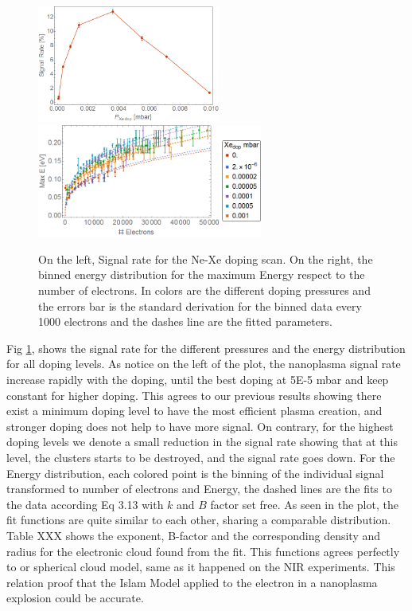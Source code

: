 \begin{figure}[h!]
\centering

\hspace*{\fill}
{ \includegraphics[width=6cm]{../Images/results/MIR_Ne_XeDop_39K/SigRate.png}} \hfill {\includegraphics[width=7.4cm]{../Images/results/MIR_Ne_XeDop_39K/binned.png}}
\hspace*{\fill}
\caption[MIR Ne-Xe doping scan. Signal rate and Energy distribution]{On the left, Signal rate for the Ne-Xe doping scan. On the right, the binned energy distribution for the maximum Energy respect to the number of electrons. In colors are the different doping pressures and the errors bar is the standard derivation for the binned data every 1000 electrons and the dashes line are the fitted parameters.}
\label{fig:NeonsigrateXedop}
\end{figure}


Fig \ref{fig:NeonsigrateXedop}, shows the signal rate for the different pressures and the energy distribution for all doping levels. As notice on the left of the plot, the nanoplasma signal rate increase rapidly with the doping, until the best doping at 5E-5 mbar and keep constant for higher doping. This agrees to our previous results showing there exist a minimum doping level to have the most efficient plasma creation, and stronger doping does not help to have more signal. On contrary, for the highest doping levels we denote a small reduction in the signal rate showing that at this level, the clusters starts to be destroyed, and the signal rate goes down.
For the Energy distribution, each colored point is the binning of the individual signal transformed to number of electrons and Energy, the dashed lines are the fits to the data according Eq 3.13 with $k$ and $B$ factor set free. As seen in the plot, the fit functions are quite similar to each other, sharing a comparable distribution. Table XXX shows the exponent, B-factor and the corresponding density and radius for the electronic cloud found from the fit. This functions agrees perfectly to or spherical cloud model, same as it happened on the NIR experiments. This relation proof that the Islam Model applied to the electron in a nanoplasma explosion could be accurate.

